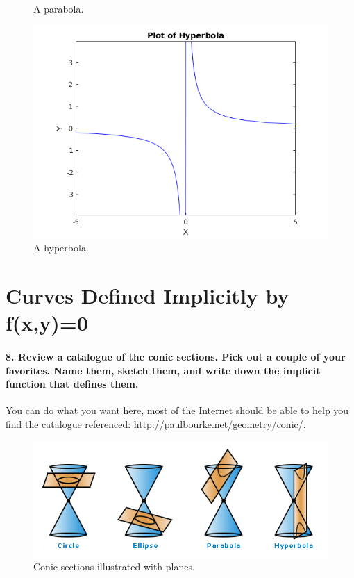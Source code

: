 \documentclass{article}
\begin{document}
\begin{figure}
\begin{minipage}{0.3\textwidth}
            \caption{A parabola.}
        \end{minipage}\hfill
        \begin{minipage}{0.3\textwidth}
            \centering
            \includegraphics[width=\linewidth]{figs_and_code/hyperbola_2d.png}
            \caption{A hyperbola.}
        \end{minipage}\hfill
\end{figure}

\section{Curves Defined Implicitly by f(x,y)=0}

\paragraph{8. Review a catalogue of the conic sections. Pick out a couple of your favorites. Name them, sketch them, and write down the implicit function that defines them.} 

You can do what you want here, most of the Internet should be able to help you find the catalogue referenced: \url{http://paulbourke.net/geometry/conic/}. 

\begin{figure}[h!]
    \centering
    \includegraphics[width=0.75\columnwidth]{figs_and_code/conicsections.png}
    \caption{Conic sections illustrated with planes.}
\end{figure}
\end{document}
